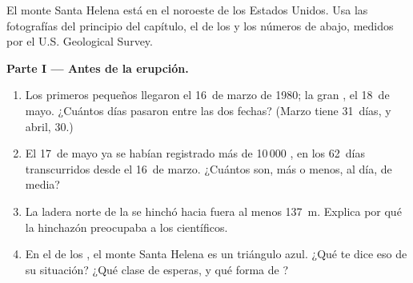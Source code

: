 \begin{problem}
\label{pb:g7:volcanoes:1}

El monte Santa Helena está en el noroeste de los Estados Unidos. Usa las
fotografías del principio del capítulo, el  de los  y los
números de abajo, medidos por el U.S. Geological Survey.

\medskip
\noindent\textbf{Parte I --- Antes de la erupción.}
\begin{enumerate}
  \item Los primeros pequeños  llegaron el 16~de marzo de 1980; la
        gran , el 18~de mayo. ¿Cuántos días pasaron entre las dos
        fechas? (Marzo tiene 31~días, y abril, 30.)
  \item El 17~de mayo ya se habían registrado más de 10\,000 ,
        en los 62~días transcurridos desde el 16~de marzo. ¿Cuántos son,
        más o menos, al día, de media?
  \item La ladera norte de la  se hinchó hacia fuera al menos
        \qty{137}{m}. Explica por qué la hinchazón preocupaba a los
        científicos.
  \item En el  de los , el monte Santa Helena es un triángulo
        azul. ¿Qué te dice eso de su situación? ¿Qué clase de 
        esperas, y qué forma de ?
\end{enumerate}


\end{problem}
